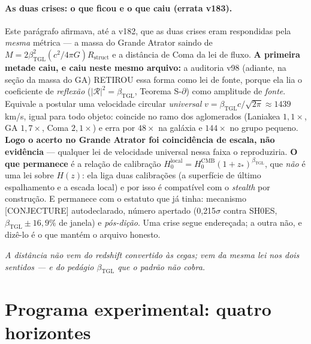 \documentclass[11pt]{article}
\newcommand{\bTGL}{\beta_{\mathrm{TGL}}}\newcommand{\Msun}{M_{\odot}}\newcommand{\TGL}{\mathrm{TGL}}
\theoremstyle{definition}\newtheorem{deriv}{Derivação}
\begin{document}
\paragraph{As duas crises: o que ficou e o que caiu (errata v183).} Este parágrafo afirmava, até a v182, que as duas crises eram respondidas pela \emph{mesma} métrica --- a massa do Grande Atrator saindo de $M=2\bTGL^2(c^2/4\pi G)R_{\mathrm{struct}}$ e a distância de Coma da lei de fluxo. \textbf{A primeira metade caiu, e caiu neste mesmo arquivo:} a auditoria v98 (adiante, na seção da massa do GA) RETIROU essa forma como lei de fonte, porque ela lia o coeficiente de \emph{reflexão} ($|\mathcal{R}|^2=\bTGL$, Teorema S-$\partial$) como amplitude de \emph{fonte}. Equivale a postular uma velocidade circular \emph{universal} $v=\bTGL c/\sqrt{2\pi}\approx 1439$ km/s, igual para todo objeto: coincide no ramo dos aglomerados (Laniakea $1{,}1\times$, GA $1{,}7\times$, Coma $2{,}1\times$) e erra por $48\times$ na galáxia e $144\times$ no grupo pequeno. \textbf{Logo o acerto no Grande Atrator foi coincidência de escala, não evidência} --- qualquer lei de velocidade universal nessa faixa o reproduziria. \textbf{O que permanece} é a relação de calibração $H_0^{\mathrm{local}}=H_0^{\mathrm{CMB}}(1+z_*)^{\bTGL}$, que \emph{não} é uma lei sobre $H(z)$: ela liga duas calibrações (a superfície de último espalhamento e a escada local) e por isso é compatível com o \emph{stealth} por construção. E permanece com o estatuto que já tinha: mecanismo \textsf{[CONJECTURE]} autodeclarado, número apertado (0{,}215$\sigma$ contra SH0ES, $\bTGL\pm16{,}9\%$ de janela) e \emph{pós-dição}. Uma crise segue endereçada; a outra não, e dizê-lo é o que mantém o arquivo honesto.

\emph{A distância não vem do redshift convertido às cegas; vem da mesma lei nos dois sentidos --- e do pedágio $\bTGL$ que o padrão não cobra.}

\section{Programa experimental: quatro horizontes}\label{sec:horizontes}
\end{document}
